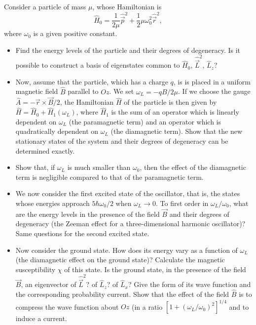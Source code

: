 \documentclass[10pt,a4paper]{article}
\newenvironment{problem}[2][Problem]{\begin{trivlist}
\item[\hskip \labelsep {\bfseries #1}\hskip \labelsep {\bfseries #2.}]}{\end{trivlist}}
\begin{document}
\begin{problem}{5}
[C-T Exercise 7-2] Consider a particle of mass $\mu$, whose Hamiltonian is
\[
\hat{H}_0=\frac{1}{2\mu}\hat{\vec{p}}^2+\frac{1}{2}\mu\omega_0^2\hat{\vec{r}}^2,
\]
where $\omega_0$ is a given positive constant.
\begin{itemize}
\item[(a)] Find the energy levels of the particle and their degrees of degeneracy. Is it possible to construct a basis of eigenstates common to $\hat{H}_0$, $\hat{\vec{L}}^2$, $\hat{L}_z$?
\item[(b)] Now, assume that the particle, which has a charge $q$, is is placed in a uniform magnetic field $\hat{B}$ parallel to $Oz$. We set $\omega_L=-qB/2\mu$. If we choose the gauge $\hat{A}=-\vec{r}\times\vec{B}/2$, the Hamiltonian $\hat{H}$ of the particle is then given by $\hat{H}=\hat{H}_0+\hat{H}_1(\omega_L)$, where $\hat{H}_1$ is the sum of an operator which is linearly dependent on $\omega_L$ (the paramagnetic term) and an operator which is quadratically dependent on $\omega_L$ (the diamagnetic term). Show that the new stationary states of the system and their degrees of degeneracy can be determined exactly.
\item[(c)] Show that, if $\omega_L$ is much smaller than $\omega_0$,  then the effect of the diamagnetic term is negligible compared to that of the paramagnetic term.
\item[(d)] We now consider the first excited state of the oscillator, that is, the states whose energies approach $5\hbar\omega_0/2$ when $\omega_L\rightarrow0$. To first order in $\omega_L/\omega_0$, what are the energy levels in the presence of the field $\vec{B}$ and their degrees of degeneracy (the Zeeman effect for a three-dimensional harmonic oscillator)? Same questions for the second excited state.
\item[(e)] Now consider the ground state. How does its energy vary as a function of $\omega_L$ (the diamagnetic effect on the ground state)? Calculate the magnetic susceptibility $\chi$ of this state. Is the ground state, in the presence of the field $\vec{B}$, an eigenvector of $\hat{\vec{L}}^2$? of $\hat{L}_z$? of $\hat{L}_x$? Give the form of its wave function and the corresponding probability current. Show that the effect of the field $\hat{B}$ is to compress the wave function about $Oz$  (in a ratio $[1+(\omega_L/\omega_0)^2]^{1/4}$ and to induce a current.
\end{itemize}
\end{problem}
\end{document}
